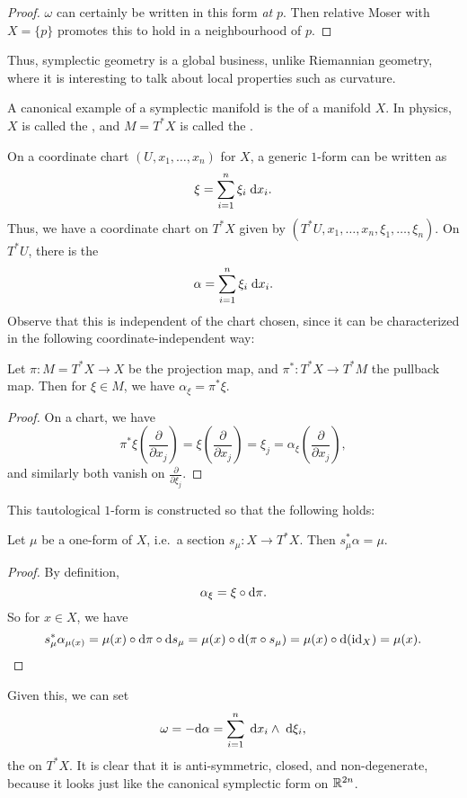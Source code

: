 \documentclass[a4paper]{article}
\begin{document}
\begin{proof}
  $\omega$ can certainly be written in this form \emph{at} $p$. Then relative Moser with $X = \{p\}$ promotes this to hold in a neighbourhood of $p$.
\end{proof}
Thus, symplectic geometry is a global business, unlike Riemannian geometry, where it is interesting to talk about local properties such as curvature.

A canonical example of a symplectic manifold is the  of a manifold $X$. In physics, $X$ is called the , and $M = T^*X$ is called the .

On a coordinate chart $(U, x_1, \ldots, x_n)$ for $X$, a generic $1$-form can be written as
\[
  \xi = \sum_{i = 1}^n \xi_i \;\mathrm{d} x_i.
\]
Thus, we have a coordinate chart on $T^*X$ given by $(T^* U, x_1, \ldots, x_n, \xi_1, \ldots, \xi_n)$. On $T^* U$, there is the 
\[
  \alpha = \sum_{i = 1}^n \xi_i \;\mathrm{d} x_i.
\]
Observe that this is independent of the chart chosen, since it can be characterized in the following coordinate-independent way:

\begin{prop}
  Let $\pi: M = T^*X \to X$ be the projection map, and $\pi^*: T^*X \to T^* M$ the pullback map. Then for $\xi \in M$, we have $\alpha_\xi = \pi^* \xi$.
\end{prop}

\begin{proof}
 On a chart, we have
 \[
   \pi^* \xi\left( \frac{\partial}{\partial x_j}\right) = \xi\left(\frac{\partial}{\partial x_j}\right) = \xi_j = \alpha_\xi \left(\frac{\partial}{\partial x_j}\right),
 \]
 and similarly both vanish on $\frac{\partial}{\partial \xi_j}$.
\end{proof}
This tautological $1$-form is constructed so that the following holds:
\begin{prop}
  Let $\mu$ be a one-form of $X$, i.e.\ a section $s_\mu: X \to T^* X$. Then $s_\mu^* \alpha = \mu$.
\end{prop}

\begin{proof}
  By definition,
  \[
    \alpha_\xi = \xi \circ \mathrm{d} \pi.
  \]
  So for $x \in X$, we have
  \[
    s_\mu^*\alpha_{\mu(x)} = \mu(x) \circ \mathrm{d} \pi \circ \mathrm{d} s_\mu = \mu(x) \circ \mathrm{d} (\pi \circ s_\mu) = \mu(x) \circ \mathrm{d}(\mathrm{id}_X) = \mu(x).\qedhere
  \]
\end{proof}

Given this, we can set
\[
  \omega = - \mathrm{d} \alpha = \sum_{i = 1}^n \;\mathrm{d} x_i \wedge \;\mathrm{d} \xi_i,
\]
the  on $T^* X$. It is clear that it is anti-symmetric, closed, and non-degenerate, because it looks just like the canonical symplectic form on $\mathbb{R}^{2n}$.
\end{document}
